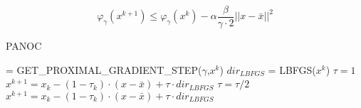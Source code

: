 	\begin{equation}
		\varphi_{\gamma}(x^{k+1}) \leq 		\varphi_{\gamma}(x^{k}) - \alpha \frac{\beta }{\gamma \cdot 2} ||x-\bar{x}||^2
		\label{eq:practical line-search with FBE}
	\end{equation}
	
	
		
		\begin{algorithm}
			\caption{PANOC}
			\label{alg:PANOC}
			\begin{algorithmic}[1]
				 = GET\_PROXIMAL\_GRADIENT\_STEP($\gamma$,$x^k$)
				\State $ dir_{LBFGS}$ = LBFGS($x^k$)
				\State $\tau =1$
				\State $x^{k+1} = x_k - (1-\tau_k)\cdot (x-\bar{x}) + \tau \cdot dir_{LBFGS}$
				\State $\tau = \tau / 2$
				\State $x^{k+1} = x_k - (1-\tau_k)\cdot (x-\bar{x}) + \tau \cdot dir_{LBFGS}$
				\EndWhile
				\EndProcedure
			\end{algorithmic}
		\end{algorithm}
	